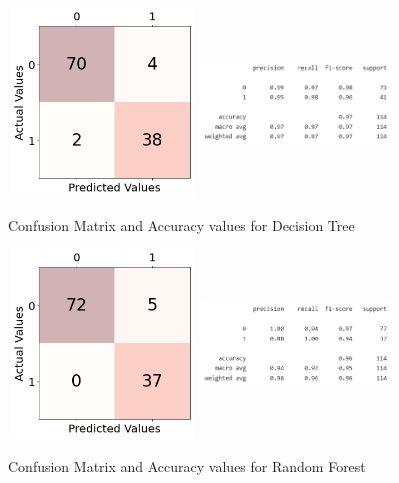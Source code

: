 \documentclass[10pt,twocolumn,letterpaper]{article}
\begin{document}
\begin{figure}[!ht]
    \centering
    \includegraphics[width=5cm, height=5cm, keepaspectratio]{Images/output5.png}
    \includegraphics[width=5cm, height=5cm, keepaspectratio]{Images/Picture8.png}
    \caption{Confusion Matrix and Accuracy values for Decision Tree}
    \label{fig:my_label}
\end{figure}

\begin{figure}[!ht]
    \centering
    \includegraphics[width=5cm, height=5cm, keepaspectratio]{Images/output6.png}
    \includegraphics[width=5cm, height=5cm, keepaspectratio]{Images/Picture10.png}
    \caption{Confusion Matrix and Accuracy values for Random Forest}
    \label{fig:my_label}
\end{figure}
\end{document}
